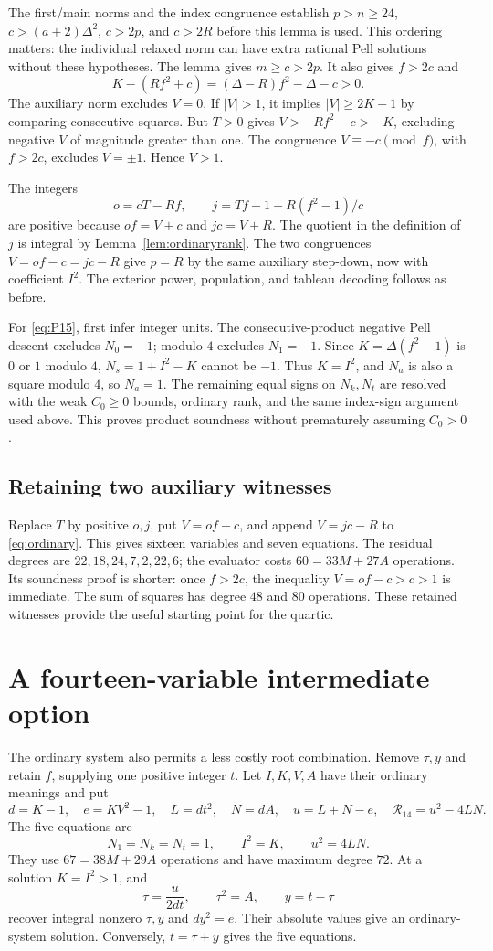 \documentclass[11pt,a4paper]{article}
\theoremstyle{remark}\newtheorem{remark}[theorem]{Remark}
\begin{document}
The first/main norms and the index congruence establish
$p>n\ge24$, $c>(a+2)\Delta^2$, $c>2p$, and $c>2R$
before this lemma is used. This ordering matters: the individual relaxed
norm can have extra rational Pell solutions without these hypotheses.
The lemma gives $m\ge c>2p$. It also gives $f>2c$ and
\[
 K-(Rf^2+c)=(\Delta-R)f^2-\Delta-c>0.
\]
The auxiliary norm excludes $V=0$. If $|V|>1$, it implies
$|V|\ge2K-1$ by comparing consecutive squares. But $T>0$ gives
$V>-Rf^2-c>-K$, excluding negative $V$ of magnitude greater than
one. The congruence $V\equiv-c\pmod f$, with $f>2c$, excludes
$V=\pm1$. Hence $V>1$.

The integers
\[
 o=cT-Rf,\qquad j=Tf-1-R(f^2-1)/c
\]
are positive because $of=V+c$ and $jc=V+R$. The quotient in the
definition of $j$ is integral by Lemma~\ref{lem:ordinaryrank}.
The two congruences $V=of-c=jc-R$ give $p=R$ by the same auxiliary
step-down, now with coefficient $I^2$. The exterior power, population,
and tableau decoding follows as before.

For \eqref{eq:P15}, first infer integer units. The consecutive-product
negative Pell descent excludes $N_0=-1$; modulo $4$ excludes
$N_1=-1$. Since $K=\Delta(f^2-1)$ is $0$ or $1$ modulo $4$,
$N_s=1+I^2-K$ cannot be $-1$. Thus $K=I^2$, and $N_a$ is also
a square modulo $4$, so $N_a=1$. The remaining equal signs on
$N_k,N_t$ are resolved with the weak $C_0\ge0$ bounds, ordinary rank,
and the same index-sign argument used above. This proves product
soundness without prematurely assuming $C_0>0$.

\subsection{Retaining two auxiliary witnesses}
Replace $T$ by positive $o,j$, put $V=of-c$, and append
$V=jc-R$ to \eqref{eq:ordinary}. This gives sixteen variables and
seven equations. The residual degrees are $22,18,24,7,2,22,6$;
the evaluator costs $60=33M+27A$ operations. Its soundness proof is
shorter: once $f>2c$, the inequality $V=of-c>c>1$ is immediate.
The sum of squares has degree $48$ and $80$ operations. These
retained witnesses provide the useful starting point for the quartic.

\section{A fourteen-variable intermediate option}
\label{sec:fourteen}

The ordinary system also permits a less costly root combination.
Remove $\tau,y$ and retain $f$, supplying one positive integer $t$.
Let $I,K,V,A$ have their ordinary meanings and put
\[
 d=K-1,\quad e=KV^2-1,\quad L=dt^2,\quad N=dA,\quad
 u=L+N-e,\quad \mathcal R_{14}=u^2-4LN.
\]
The five equations are
\[
 N_1=N_k=N_t=1,\qquad I^2=K,\qquad u^2=4LN.
\]
They use $67=38M+29A$ operations and have maximum degree $72$.
At a solution $K=I^2>1$, and
\[
 \tau=\frac{u}{2dt},\qquad \tau^2=A,\qquad y=t-\tau
\]
recover integral nonzero $\tau,y$ and $dy^2=e$.
Their absolute values give an ordinary-system solution. Conversely,
$t=\tau+y$ gives the five equations.
\end{document}
